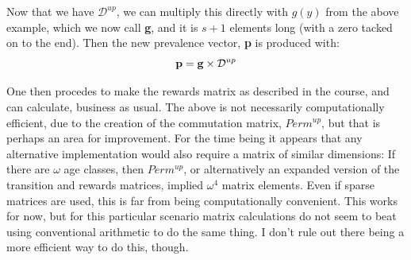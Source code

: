 \documentclass[11pt,oneside,a4paper]{article} %
\begin{document}
Now that we have $\mathcal{D}^{up}$, we can multiply this directly with $g(y)$
from the above example, which we now call \textbf{g}, and it is $s+1$ elements
long (with a zero tacked on to the end). Then the new prevalence vector,
\textbf{p} is produced with:
\begin{equation}
 \text{\textbf{p}} = \text{\textbf{g}} \times \mathcal{D}^{up}
\end{equation}

One then procedes to make the rewards matrix as described in the course, and can
calculate, business as usual. The above is not necessarily computationally
efficient, due to the creation of the commutation matrix, $Perm^{up}$, but that
is perhaps an area for improvement. For the time being it appears that any
alternative implementation would also require a matrix of similar dimensions:
If there are $\omega$ age classes, then $Perm^{up}$, or alternatively an
expanded version of the transition and rewards matrices, implied $\omega^4$
matrix elements. Even if sparse matrices are used, this is far from
being computationally convenient. This works for now, but for this particular
scenario matrix calculations do not seem to beat using conventional arithmetic
to do the same thing. I don't rule out there being a more efficient way to do
this, though.




\end{document}
